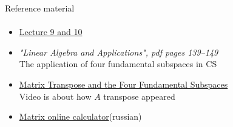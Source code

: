 \documentclass[aspectratio=169]{beamer}
\newcommand{\fbckg}[1]{\usebackgroundtemplate{\texttt{[image: \#1]}}}%
\begin{document}


\begin{frame}[t]{Reference material}
    \framesubtitle{}
    \Large
    \begin{itemize}
        \item \href{https://www.youtube.com/watch?v=yjBerM5jWsc&list=PL49CF3715CB9EF31D&index=9}{Lecture 9 and 10}
        \item \textit{"Linear Algebra and Applications", pdf pages 139--149 }\\ The application of four fundamental subspaces in CS
        \item \href{https://youtu.be/yfj8uMwAgrI}{Matrix Transpose and the Four Fundamental Subspaces}\\ Video is about how $A$ transpose appeared
        \item \href{https://matworld.ru/calculator/matrix-calculator-1.php}{Matrix online calculator}(russian)
    \end{itemize}
\end{frame}

\usebackgroundtemplate{}


\fbckg{fibeamer/figs/last_page.png}
\frame[plain]{}
\end{document}

